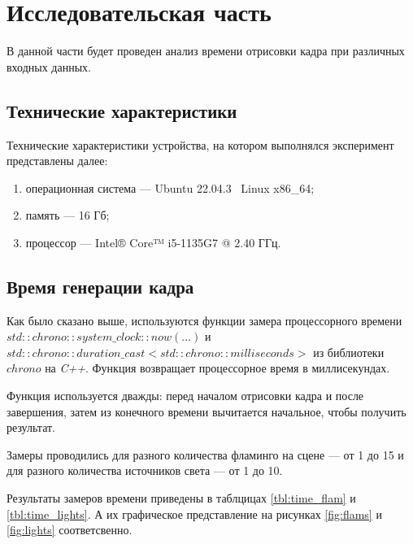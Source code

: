 \chapter{Исследовательская часть}

В данной части будет проведен анализ времени отрисовки кадра при различных входных данных.

\section{Технические характеристики}

Технические характеристики устройства, на котором выполнялся эксперимент представлены далее:

\begin{enumerate}[label=\arabic*)]
	\item операционная система --- Ubuntu 22.04.3~\cite{ubuntu} Linux x86\_64;
	\item память --- 16 Гб;
	\item процессор --- Intel® Core™ i5-1135G7 @ 2.40 ГГц.
\end{enumerate}

\section{Время генерации кадра}

Как было сказано выше, используются функции замера процессорного времени \textit{$std::chrono::system\_clock::now(...)$} и \textit{$std::chrono::duration\_cast<std::chrono::milliseconds>$} из библиотеки $chrono$ на \textit{C++}. Функция возвращает процессорное время в миллисекундах.

Функция используется дважды: перед началом отрисовки кадра и после завершения, затем из конечного времени вычитается начальное, чтобы получить результат.

Замеры проводились для разного количества фламинго на сцене --- от 1 до 15 и для разного количества источников света --- от 1 до 10.

Результаты замеров времени приведены в таблцицах \ref{tbl:time_flam} и \ref{tbl:time_lights}. А их графическое представление на рисунках \ref{fig:flams} и \ref{fig:lights} соответсвенно.

